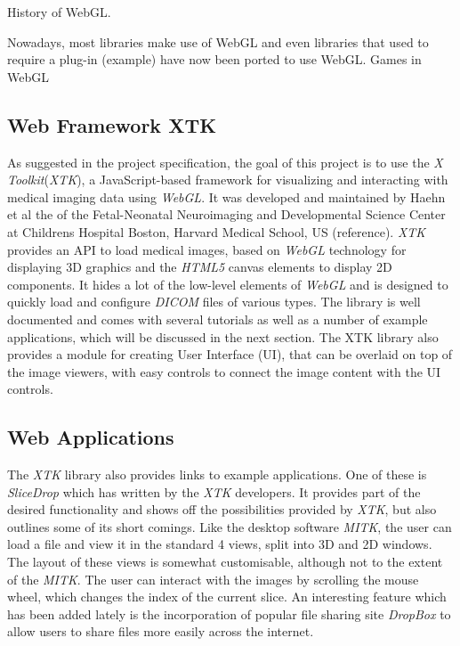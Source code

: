 \documentclass[a4paper,11pt,titlepage]{article}
\begin{document}
History of WebGL. 

Nowadays, most libraries make use of WebGL and even libraries that used to require a plug-in (example) have now been ported to use WebGL. 
Games in WebGL


\subsection{Web Framework XTK}

As suggested in the project specification, the goal of this project is to use the \textit{X Toolkit}(\textit{XTK}), a JavaScript-based framework for visualizing and interacting with medical imaging data using \textit{WebGL}. It was developed and maintained by Haehn et al the of the Fetal-Neonatal Neuroimaging and Developmental Science Center at Childrens Hospital Boston, Harvard Medical School, US (reference). \textit{XTK} provides an API to load medical images, based on \textit{WebGL} technology for displaying 3D graphics and the \textit{HTML5} canvas elements to display 2D components. It hides a lot of the low-level elements of \textit{WebGL} and is designed to quickly load and configure \textit{DICOM} files of various types. The library is well documented and comes with several tutorials as well as a number of example applications, which will be discussed in the next section.
The XTK library also provides a module for creating User Interface (UI), that can be overlaid on top of the image viewers, with easy controls to connect the image content with the UI controls.


\subsection{Web Applications}
The \textit{XTK} library also provides links to example applications. One of these is \textit{SliceDrop} which has written by the \textit{XTK} developers. It provides part of the desired functionality and shows off the possibilities provided by \textit{XTK}, but also outlines some of its short comings. Like the desktop software \textit{MITK}, the user can load a file and view it in the standard 4 views, split into 3D and 2D windows. The layout of these views is somewhat customisable, although not to the extent of the \textit{MITK}. The user can interact with the images by scrolling the mouse wheel, which changes the index of the current slice. An interesting feature which has been added lately is the incorporation of popular file sharing site \textit{DropBox} to allow users to share files more easily across the internet.
\end{document}
